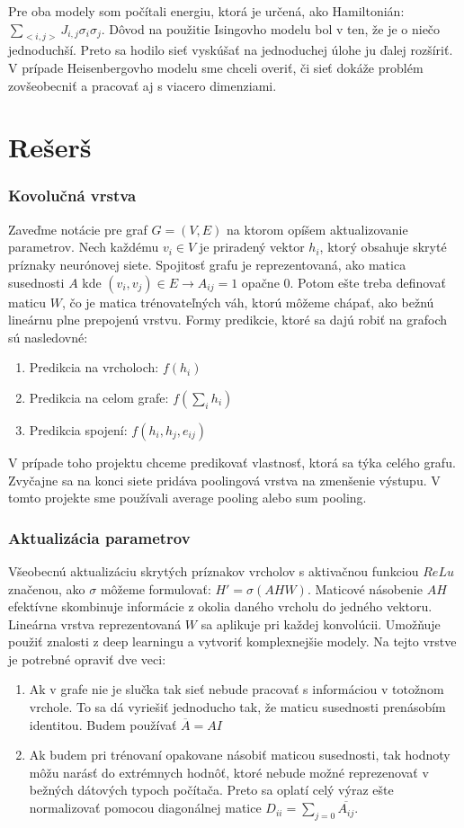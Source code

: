 \documentclass{article}
\begin{document}
Pre oba modely som počítali energiu, ktorá je určená, ako Hamiltonián: $\sum_{<i,j>} J_{i,j}\sigma_i \sigma_j$. Dôvod na použitie Isingovho modelu bol v ten, že je o niečo jednoduchší. Preto sa hodilo sieť vyskúšať na jednoduchej úlohe ju ďalej rozšíriť. V prípade Heisenbergovho modelu sme chceli overiť, či sieť dokáže problém zovšeobecniť a pracovať aj s viacero dimenziami.


\section*{Rešerš}
\subsubsection*{Kovolučná vrstva} 
Zaveďme notácie pre graf $G=(V,E)$ na ktorom opíšem aktualizovanie parametrov. Nech každému $v_i \in V$ je priradený vektor $h_i$, ktorý obsahuje skryté príznaky neurónovej siete. Spojitosť grafu je reprezentovaná, ako matica susednosti $A$ kde $(v_i, v_j) \in E \rightarrow A_{ij} = 1$ opačne 0. Potom ešte treba definovať maticu $W$, čo je matica trénovateľných váh, ktorú môžeme chápať, ako bežnú lineárnu plne prepojenú vrstvu. Formy predikcie, ktoré sa dajú robiť na grafoch sú nasledovné:
\begin{enumerate}
    \item Predikcia na vrcholoch: $f(h_i)$
    \item Predikcia na celom grafe: $f(\sum_i h_i)$
    \item Predikcia spojení: $f(h_i, h_j, e_{ij})$
\end{enumerate}

V prípade toho projektu chceme predikovať vlastnosť, ktorá sa týka celého grafu. Zvyčajne sa na konci siete pridáva poolingová vrstva na zmenšenie výstupu. V tomto projekte sme používali average pooling alebo sum pooling.

\subsubsection*{Aktualizácia parametrov}
Všeobecnú aktualizáciu skrytých príznakov vrcholov s aktivačnou funkciou $ReLu$ značenou, ako $\sigma$ môžeme formulovať: $H' = \sigma(AHW)$. Maticové násobenie $AH$ efektívne skombinuje informácie z okolia daného vrcholu do jedného vektoru. Lineárna vrstva reprezentovaná $W$ sa aplikuje pri každej konvolúcii. Umožňuje použiť znalosti z deep learningu a vytvoriť komplexnejšie modely. Na tejto vrstve je potrebné opraviť dve veci:
\begin{enumerate}
    \item Ak v grafe nie je slučka tak sieť nebude pracovať s informáciou v totožnom vrchole. To sa dá vyriešiť jednoducho tak, že maticu susednosti prenásobím identitou. Budem používať $\overline{A} = A I$
    \item Ak budem pri trénovaní opakovane násobiť maticou susednosti, tak hodnoty môžu narásť do extrémnych hodnôť, ktoré nebude možné reprezenovať v bežných dátových typoch počítača. Preto sa oplatí celý výraz ešte normalizovať pomocou diagonálnej matice $D_{ii} = \sum_{j=0} \overline{A_{ij}}$.
\end{enumerate}
\end{document}
